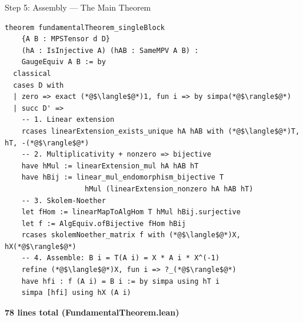 \documentclass[aspectratio=169,10pt]{beamer}
\begin{document}
\begin{frame}[fragile]{Step 5: Assembly --- The Main Theorem}
\vspace{-0.8em}
\begin{lstlisting}[basicstyle=\ttfamily\fontsize{6}{7.5}\selectfont\color{white}]
theorem fundamentalTheorem_singleBlock
    {A B : MPSTensor d D}
    (hA : IsInjective A) (hAB : SameMPV A B) :
    GaugeEquiv A B := by
  classical
  cases D with
  | zero => exact (*@$\langle$@*)1, fun i => by simpa(*@$\rangle$@*)
  | succ D' =>
    -- 1. Linear extension
    rcases linearExtension_exists_unique hA hAB with (*@$\langle$@*)T, hT, -(*@$\rangle$@*)
    -- 2. Multiplicativity + nonzero => bijective
    have hMul := linearExtension_mul hA hAB hT
    have hBij := linear_mul_endomorphism_bijective T
                   hMul (linearExtension_nonzero hA hAB hT)
    -- 3. Skolem-Noether
    let fHom := linearMapToAlgHom T hMul hBij.surjective
    let f := AlgEquiv.ofBijective fHom hBij
    rcases skolemNoether_matrix f with (*@$\langle$@*)X, hX(*@$\rangle$@*)
    -- 4. Assemble: B i = T(A i) = X * A i * X^(-1)
    refine (*@$\langle$@*)X, fun i => ?_(*@$\rangle$@*)
    have hfi : f (A i) = B i := by simpa using hT i
    simpa [hfi] using hX (A i)
\end{lstlisting}
\vspace{-0.5em}
\begin{center}
{\small\textcolor{leangreen}{\checkmark}\;\textbf{78 lines total (FundamentalTheorem.lean)}\;\textcolor{leangreen}{\checkmark}}
\end{center}
\end{frame}
\end{document}
